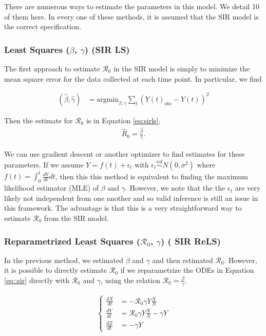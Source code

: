 \documentclass[12pt]{article}
\newcommand{\rr}{\ensuremath{\mathcal{R}_0}}
\begin{document}
There are numerous ways to estimate the parameters in this model.  We detail 10 of them here.  In every one of these methods, it is assumed that the SIR model is the correct specification.

\subsubsection{Least Squares ($\beta$, $\gamma$) (SIR LS)}\label{least-squares-beta-gamma}
The first approach to estimate $\rr$ in the SIR model is simply to minimize the mean square error for the data collected at each time point.  In particular, we find

\begin{align*}
(\hat{\beta}, \hat{\gamma} )&=\text{argmin}_{\beta, \gamma} \sum_{t} (Y(t)_{obs} - Y(t))^2 
\end{align*}

Then  the estimate for $\rr$ is in Equation \ref{eq:sirls},
\begin{align}\label{eq:sirls}
  \hat{R}_0= \frac{\hat{\beta}}{\hat{\gamma}}.
  \end{align}

We can use gradient descent or another optimizer to find estimates for these parameters.  If we assume $Y= f(t) + \epsilon_t$ with $\epsilon_t \overset{iid}{\sim} N(0, \sigma^2)$ where $f(t) = \int_0^t \frac{dY}{dt} dt$, then this this method is equivalent to finding the maximum likelihood estimator (MLE) of $\beta$ and $\gamma$.  However, we note that the the $\epsilon_t$ are very likely not independent from one another and so valid inference is still an issue in this framework.  The advantage is that this is a very straightforward way to estimate $\rr$ from the SIR model.

\subsubsection{Reparametrized Least Squares ($\rr$, $\gamma$) ( SIR ReLS)}\label{reparametrized-least-squares-rux5f0-gamma}

In the previous method, we estimated $\beta$ and $\gamma$ and then estimated $\rr$.  However, it is possible to directly estimate $\rr$ if we reparametrize the ODEs in Equation \eqref{eq::sir} directly with \(\rr\) and \(\gamma\), using the relation $\rr = \frac{\beta}{\gamma}$.

\begin{align*}
  \left \{
  \begin{array}{cl}
    \frac{dX}{dt} &= - \rr \gamma Y \frac{X}{N}\\
    \frac{dY}{dt} &=  \rr \gamma Y \frac{X}{N}  - \gamma Y \\
    \frac{dZ}{dt} &=  - \gamma Y 
  \end{array}
  \right .
  \end{align*}
\end{document}
